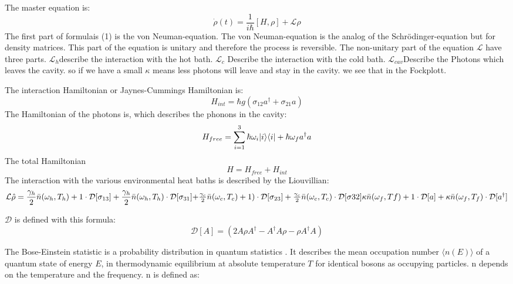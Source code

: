 \documentclass[12pt,a4paper]{article}
\DeclarePairedDelimiter\bra{\langle}{\rvert}
\DeclarePairedDelimiter\ket{\lvert}{\rangle}
\begin{document}
\newpage
The master equation is:
\begin{equation}
\dot{\rho}(t)=\frac{1}{i \hbar}[H,\rho]+ \mathcal{L}\rho
\end{equation}
The first part of formulais (1) is the von Neuman-equation. The von Neuman-equation is the analog of the Schrödinger-equation but for density matrices. This part of the equation is unitary and therefore the process is reversible.
The non-unitary part of the equation 
$\mathcal{L}$ have three parts. $\mathcal{L}_h$describe the interaction with the hot bath.
$\mathcal{L}_c$ Describe the interaction with the cold bath.
$\mathcal{L}_{cav}$Describe the Photons which leaves the cavity. so if we have a small $\kappa$ means less photons will leave and stay in the cavity. we see that in the Fockplott.

The interaction Hamiltonian or Jaynes-Cummings Hamiltonian is:
\begin{equation}
H_{int}=\hbar g(\sigma_{12}a^{\dag}+\sigma_{21}a)
\end{equation}
The  Hamiltonian of the photons is, which describes the phonons in the cavity:
\begin{equation}
H_{free}=\sum_{i=1}^3 \hbar \omega_i \ket{i}\bra{i}+\hbar \omega_f a^{\dag}a
\end{equation}
The total Hamiltonian
\begin{equation}
H=H_{free}+H_{int}
\end{equation}
\newpage
The interaction with the various environmental heat baths is described by the Liouvillian:
\begin{equation}
\mathcal{L}\hat{\rho}=\frac{\gamma_h}{2}\bar{n}(\omega_h,T_h)+1   \cdot \mathcal{D}[\sigma_{13}]
+\frac{\gamma_h}{2}\bar{n}(\omega_h,T_h)\cdot \mathcal{D}[\sigma_{31}]$$\\$$
+\frac{\gamma_c}{2}\bar{n}(\omega_c,T_c)+1)\cdot \mathcal{D}[\sigma_{23}]
+\frac{\gamma_c}{2}\bar{n}(\omega_c,T_c) \cdot	 \mathcal{D}[\sigma{32}]$$\\$$
\kappa\bar{n}(\omega_f,Tf)+1	\cdot\mathcal{D}[a]+
\kappa \bar{n}(\omega_f,T_f)\cdot \mathcal{D}[a^{\dag}]
\end{equation}

$\mathcal{D}$ is defined with this formula:
\begin{equation}
\mathcal{D}[A]=(2A \rho	A^{\dag}-A^{\dag}A\rho-\rho A^{\dag}A)
\end{equation}

The Bose-Einstein statistic is a probability distribution in quantum statistics . It describes the mean occupation number $\langle n(E) \rangle$ of a quantum state of energy $E$, in thermodynamic equilibrium at absolute temperature $T $ for identical bosons as occupying particles. n depends on the temperature and the frequency.
n is defined as:
\end{document}
